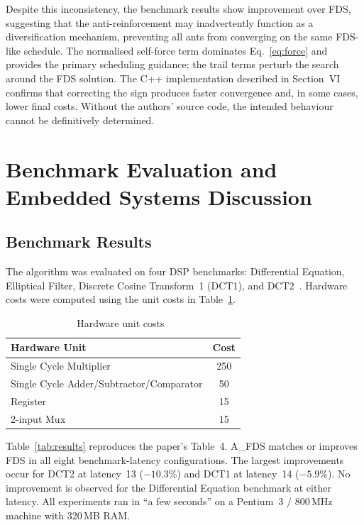 \documentclass[conference]{IEEEtran}
\begin{document}
Despite this inconsistency, the benchmark results show improvement over
FDS, suggesting that the anti-reinforcement may inadvertently function as
a diversification mechanism, preventing all ants from converging on the
same FDS-like schedule. The normalised self-force term dominates
Eq.~\eqref{eq:force} and provides the primary scheduling guidance; the
trail terms perturb the search around the FDS solution. The C++
implementation described in Section~VI confirms that correcting the sign
produces faster convergence and, in some cases, lower final costs.
Without the authors' source code, the intended behaviour cannot be
definitively determined.

\section{Benchmark Evaluation and Embedded Systems Discussion}

\subsection{Benchmark Results}

The algorithm was evaluated on four DSP benchmarks: Differential
Equation, Elliptical Filter, Discrete Cosine Transform~1 (DCT1), and
DCT2~\cite{kopuri2004aco}. Hardware costs were computed using the unit
costs in Table~\ref{tab:costs}.

\begin{table}[h]
  \centering
  \caption{Hardware unit costs~\cite{kopuri2004aco}}
  \label{tab:costs}
  \begin{tabular}{lc}
    \toprule
    Hardware Unit & Cost \\
    \midrule
    Single Cycle Multiplier & 250 \\
    Single Cycle Adder/Subtractor/Comparator & 50 \\
    Register & 15 \\
    2-input Mux & 15 \\
    \bottomrule
  \end{tabular}
\end{table}

Table~\ref{tab:results} reproduces the paper's Table~4. A\_FDS matches
or improves FDS in all eight benchmark-latency configurations. The
largest improvements occur for DCT2 at latency~13 ($-10.3\%$) and DCT1
at latency~14 ($-5.9\%$). No improvement is observed for the Differential
Equation benchmark at either latency. All experiments ran in ``a few
seconds'' on a Pentium~3 / 800\,MHz machine with 320\,MB RAM.
\end{document}
